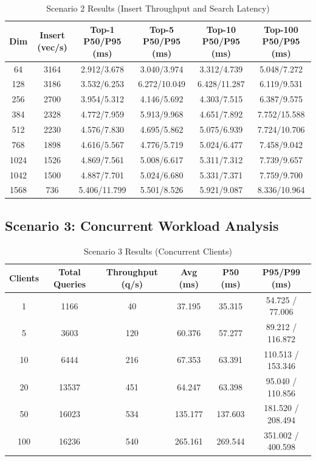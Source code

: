 \documentclass[conference]{IEEEtran}
\begin{document}
\begin{table}[!t]
\centering
\caption{Scenario 2 Results (Insert Throughput and Search Latency)}
\label{tab:scenario2}
\begin{tabular}{@{}cccccc@{}}
\toprule
\textbf{Dim} & \textbf{Insert (vec/s)} & \textbf{Top-1 P50/P95 (ms)} & \textbf{Top-5 P50/P95 (ms)} & \textbf{Top-10 P50/P95 (ms)} & \textbf{Top-100 P50/P95 (ms)} \\
\midrule
64   & 3164 & 2.912/3.678 & 3.040/3.974 & 3.312/4.739 & 5.048/7.272 \\
128  & 3186 & 3.532/6.253 & 6.272/10.049 & 6.428/11.287 & 6.119/9.531 \\
256  & 2700 & 3.954/5.312 & 4.146/5.692 & 4.303/7.515 & 6.387/9.575 \\
384  & 2328 & 4.772/7.959 & 5.913/9.968 & 4.651/7.892 & 7.752/15.588 \\
512  & 2230 & 4.576/7.830 & 4.695/5.862 & 5.075/6.939 & 7.724/10.706 \\
768  & 1898 & 4.616/5.567 & 4.776/5.719 & 5.024/6.477 & 7.458/9.042 \\
1024 & 1526 & 4.869/7.561 & 5.008/6.617 & 5.311/7.312 & 7.739/9.657 \\
1042 & 1500 & 4.887/7.701 & 5.024/6.680 & 5.331/7.371 & 7.759/9.700 \\
1568 & 736  & 5.406/11.799 & 5.501/8.526 & 5.921/9.087 & 8.336/10.964 \\
\bottomrule
\end{tabular}
\end{table}

\subsection{Scenario 3: Concurrent Workload Analysis}


\begin{table}[!t]
\centering
\caption{Scenario 3 Results (Concurrent Clients)}
\label{tab:scenario3}
\begin{tabular}{@{}cccccc@{}}
\toprule
\textbf{Clients} & \textbf{Total Queries} & \textbf{Throughput (q/s)} & \textbf{Avg (ms)} & \textbf{P50 (ms)} & \textbf{P95/P99 (ms)} \\
\midrule
1   & 1166 & 40  & 37.195 & 35.315 & 54.725 / 77.006 \\
5   & 3603 & 120 & 60.376 & 57.277 & 89.212 / 116.872 \\
10  & 6444 & 216 & 67.353 & 63.391 & 110.513 / 153.346 \\
20  & 13537& 451 & 64.247 & 63.398 & 95.040 / 110.856 \\
50  & 16023& 534 & 135.177& 137.603& 181.520 / 208.494 \\
100 & 16236& 540 & 265.161& 269.544& 351.002 / 400.598 \\
\bottomrule
\end{tabular}
\end{table}
\end{document}
